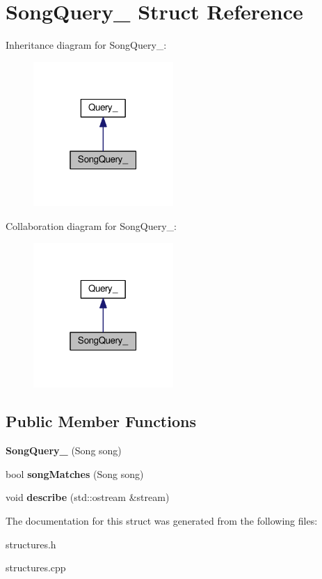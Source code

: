 \hypertarget{struct_song_query__}{}\section{Song\+Query\+\_\+ Struct Reference}
\label{struct_song_query__}


Inheritance diagram for Song\+Query\+\_\+\+:
\nopagebreak
\begin{figure}[H]
\begin{center}
\leavevmode
\includegraphics[width=151pt]{struct_song_query____inherit__graph}
\end{center}
\end{figure}


Collaboration diagram for Song\+Query\+\_\+\+:
\nopagebreak
\begin{figure}[H]
\begin{center}
\leavevmode
\includegraphics[width=151pt]{struct_song_query____coll__graph}
\end{center}
\end{figure}
\subsection*{Public Member Functions}
\begin{DoxyCompactItemize}
\item 
{\bfseries Song\+Query\+\_\+} (Song song)\hypertarget{struct_song_query___a37355624abafe27a440a803eabefc280}{}\label{struct_song_query___a37355624abafe27a440a803eabefc280}

\item 
bool {\bfseries song\+Matches} (Song song)\hypertarget{struct_song_query___a368afb7c4b4ef2fc2e80be780486f014}{}\label{struct_song_query___a368afb7c4b4ef2fc2e80be780486f014}

\item 
void {\bfseries describe} (std\+::ostream \&stream)\hypertarget{struct_song_query___a75720a128cebaa5affda9fef1cac04b2}{}\label{struct_song_query___a75720a128cebaa5affda9fef1cac04b2}

\end{DoxyCompactItemize}


The documentation for this struct was generated from the following files\+:\begin{DoxyCompactItemize}
\item 
structures.\+h\item 
structures.\+cpp\end{DoxyCompactItemize}
